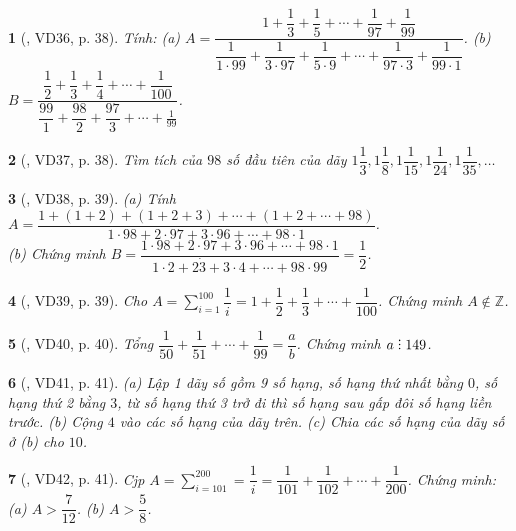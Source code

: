 \documentclass{article}
\newtheorem{baitoan}{}
\DeclareRobustCommand{\divby}{%
	\mathrel{\vbox{\baselineskip.65ex\lineskiplimit0pt\hbox{.}\hbox{.}\hbox{.}}}%
}
\begin{document}
\begin{baitoan}[\cite{Binh_Toan_6_tap_2}, VD36, p. 38]
	Tính: (a) $A = \dfrac{1 + \dfrac{1}{3} + \dfrac{1}{5} + \cdots + \dfrac{1}{97} + \dfrac{1}{99}}{\dfrac{1}{1\cdot99} + \dfrac{1}{3\cdot97} + \dfrac{1}{5\cdot9} + \cdots + \dfrac{1}{97\cdot3} + \dfrac{1}{99\cdot1}}$. (b) $B = \dfrac{\dfrac{1}{2} + \dfrac{1}{3} + \dfrac{1}{4} + \cdots + \dfrac{1}{100}}{\dfrac{99}{1} + \dfrac{98}{2} + \dfrac{97}{3} + \cdots + \frac{1}{99}}$.
\end{baitoan}

\begin{baitoan}[\cite{Binh_Toan_6_tap_2}, VD37, p. 38]
	Tìm tích của $98$ số đầu tiên của dãy $1\dfrac{1}{3},1\dfrac{1}{8},1\dfrac{1}{15},1\dfrac{1}{24},1\dfrac{1}{35},\ldots$
\end{baitoan}

\begin{baitoan}[\cite{Binh_Toan_6_tap_2}, VD38, p. 39]
	(a) Tính $A = \dfrac{1 + (1 + 2) + (1 + 2 + 3) + \cdots + (1 + 2 + \cdots + 98)}{1\cdot98 + 2\cdot97 + 3\cdot96 + \cdots + 98\cdot1}$.\\(b) Chứng minh $B = \dfrac{1\cdot98 + 2\cdot97 + 3\cdot96 + \cdots + 98\cdot1}{1\cdot2 + 2\dot3 + 3\cdot4 + \cdots + 98\cdot99} = \dfrac{1}{2}$.
\end{baitoan}

\begin{baitoan}[\cite{Binh_Toan_6_tap_2}, VD39, p. 39]
	Cho $A = \sum_{i=1}^{100} \dfrac{1}{i} = 1 + \dfrac{1}{2} + \dfrac{1}{3} + \cdots + \dfrac{1}{100}$. Chứng minh $A\notin\mathbb{Z}$.
\end{baitoan}

\begin{baitoan}[\cite{Binh_Toan_6_tap_2}, VD40, p. 40]
	Tổng $\dfrac{1}{50} + \dfrac{1}{51} + \cdots + \dfrac{1}{99} = \dfrac{a}{b}$. Chứng minh $a\divby149$.
\end{baitoan}

\begin{baitoan}[\cite{Binh_Toan_6_tap_2}, VD41, p. 41]
	(a) Lập 1 dãy số gồm 9 số hạng, số hạng thứ nhất bằng $0$, số hạng thứ 2 bằng $3$, từ số hạng thứ 3 trở đi thì số hạng sau gấp đôi số hạng liền trước. (b) Cộng $4$ vào các số hạng của dãy trên. (c) Chia các số hạng của dãy số ở (b) cho $10$.
\end{baitoan}

\begin{baitoan}[\cite{Binh_Toan_6_tap_2}, VD42, p. 41]
	Cjp $A = \sum_{i=101}^{200} = \dfrac{1}{i} = \dfrac{1}{101} + \dfrac{1}{102} + \cdots + \dfrac{1}{200}$. Chứng minh: (a) $A > \dfrac{7}{12}$. (b) $A > \dfrac{5}{8}$.
\end{baitoan}
\end{document}
